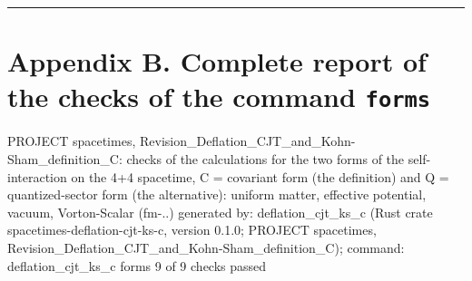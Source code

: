 \documentclass[
  10pt,
]{article}
\newenvironment{Shaded}{}{}
\newcommand{\NormalTok}[1]{#1}
\begin{document}
\begin{center}\rule{0.5\linewidth}{0.5pt}\end{center}

\hypertarget{appendix-b.-complete-report-of-the-checks-of-the-command-forms}{%
\section{\texorpdfstring{Appendix B. Complete report of the checks of
the command
\texttt{forms}}{Appendix B. Complete report of the checks of the command forms}}\label{appendix-b.-complete-report-of-the-checks-of-the-command-forms}}

\begin{Shaded}
\begin{Highlighting}[]
\NormalTok{PROJECT spacetimes, Revision\_Deflation\_CJT\_and\_Kohn{-}Sham\_definition\_C: checks of the calculations for the two forms of the self{-}interaction on the 4+4 spacetime, C = covariant form (the definition) and Q = quantized{-}sector form (the alternative): uniform matter, effective potential, vacuum, Vorton{-}Scalar (fm{-}..)}
\NormalTok{generated by: deflation\_cjt\_ks\_c (Rust crate spacetimes{-}deflation{-}cjt{-}ks{-}c, version 0.1.0; PROJECT spacetimes, Revision\_Deflation\_CJT\_and\_Kohn{-}Sham\_definition\_C); command: deflation\_cjt\_ks\_c forms}
\NormalTok{9 of 9 checks passed}


\end{Highlighting}
\end{Shaded}
\end{document}
